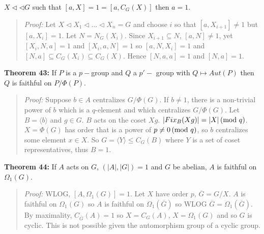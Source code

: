 $X \lhd \lhd G$ such that $[a,X]=1=[a,C_G(X)]$ then $a=1$.
\begin{quote}
\emph{Proof:}  
Let $X \lhd X_1 \lhd \ldots \lhd X_n=G$ and choose $i$ so that 
$[a, X_{i+1}] \ne 1$ but
$[a, X_{i}] = 1$.  Let $N= N_G(X_i )$.  Since $X_{i+1} \subseteq N$, $[a,N] \ne 1$, yet
$[X_i, N, a] =1$ and
$[X_i, a, N] =1$ so
$[a, N, X_i] =1$ and $[N,a] \subseteq C_G(X_i ) \subseteq C_G(X)$.  Hence
$[N,a,a] = 1$ and $[N,a] = 1$.
\end{quote}
{\bf Theorem 43:}
If $P$ is a $p-$group and $Q$ a $p'-$ group with $Q \mapsto Aut(P)$ then
$Q$ is faithful on $P/\Phi(P)$.
\begin{quote}
\emph{Proof:}  
Suppose $b \in A$ centralizes $G/\Phi(G)$.  If $b \ne 1$, there is a non-trivial
power of $b$ which is a $q$-element and which centralizes $G/ \Phi(G)$.  Let
$B= \langle b \rangle $ and $g \in G$.  $B$ acts on the coset $Xg$.  $|Fix_B(Xg)| = |X| \thinspace \textnormal{(mod } q \textnormal{)}$.
$X= \Phi(G)$ has order that is a power of $p \ne 0 \thinspace \textnormal{(mod } q \textnormal{)}$, so $b$ centralizes some
element $x \in X$.  So $G= \langle Y \rangle \le C_G(B)$ where 
$Y$ is a set of coset representatives,
thus $B=1$.
\end{quote}
{\bf Theorem 44:}
If $A$ acts on $G$, $(|A|,|G|)= 1$ and $G$ be abelian, $A$ is faithful on $\Omega_1(G)$.
\begin{quote}
\emph{Proof:}  
WLOG, $[A, \Omega_1(G)]=1$.  Let $X$ have order $p$, ${\overline G}= G/X$.  $A$ is
faithful on $\Omega_1(G)$ so $A$ is faithful on $\Omega_1({\overline G})$ so WLOG
${\overline G}= \Omega_1({\overline G})$.  By maximality, $C_{\overline G}(A)=1$ so
$X=C_G(A)$, $X= \Omega_1(G)$ and so $G$ is cyclic.  This is not possible given the
automorphism group of a cyclic group.
\end{quote}

